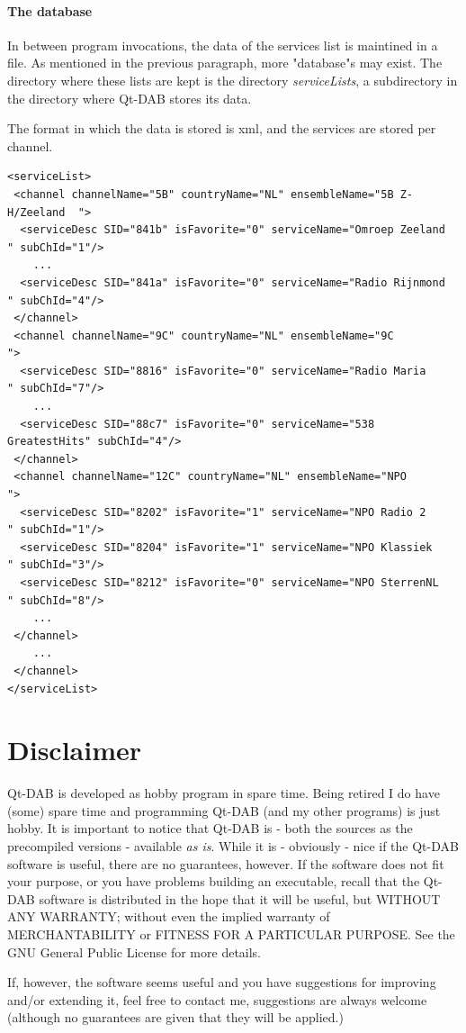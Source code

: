 \documentclass[11pt]{article}
\begin{document}
\paragraph{The database}
In between program invocations, the data of the services list is maintined in a file. As mentioned in the previous paragraph, more "database"s may exist.
The directory where these lists are kept is the directory {\em serviceLists}, a subdirectory in the directory  where Qt-DAB stores its data.
\par
The format in which the data is stored is xml, and the services are stored per channel.
\begin{verbatim}
<serviceList>
 <channel channelName="5B" countryName="NL" ensembleName="5B Z-H/Zeeland  ">
  <serviceDesc SID="841b" isFavorite="0" serviceName="Omroep Zeeland  " subChId="1"/>
	...
  <serviceDesc SID="841a" isFavorite="0" serviceName="Radio Rijnmond  " subChId="4"/>
 </channel>
 <channel channelName="9C" countryName="NL" ensembleName="9C              ">
  <serviceDesc SID="8816" isFavorite="0" serviceName="Radio Maria     " subChId="7"/>
	...
  <serviceDesc SID="88c7" isFavorite="0" serviceName="538 GreatestHits" subChId="4"/>
 </channel>
 <channel channelName="12C" countryName="NL" ensembleName="NPO             ">
  <serviceDesc SID="8202" isFavorite="1" serviceName="NPO Radio 2     " subChId="1"/>
  <serviceDesc SID="8204" isFavorite="1" serviceName="NPO Klassiek    " subChId="3"/>
  <serviceDesc SID="8212" isFavorite="0" serviceName="NPO SterrenNL   " subChId="8"/>
	...
 </channel>
	...
 </channel>
</serviceList>
\end{verbatim}
\section{Disclaimer}
Qt-DAB is developed as hobby program in spare time. Being retired I do have (some) spare time and programming Qt-DAB (and my other programs) is just hobby.
It is important to notice that Qt-DAB is - both the sources as the precompiled
versions - available {\em as is}.
While it is - obviously - nice if the Qt-DAB software is useful, there are no guarantees, however. If the software does not fit your purpose, or you have
problems building an executable, recall that the Qt-DAB software is distributed in the hope that it will be useful, but WITHOUT ANY WARRANTY; without even the implied warranty of MERCHANTABILITY or FITNESS FOR A PARTICULAR PURPOSE.
See the GNU General Public License for more details.

If, however, the software seems useful and you have suggestions for improving and/or extending it, feel free to contact me, suggestions are always welcome (although no guarantees are given that they will be applied.)
\end{document}
